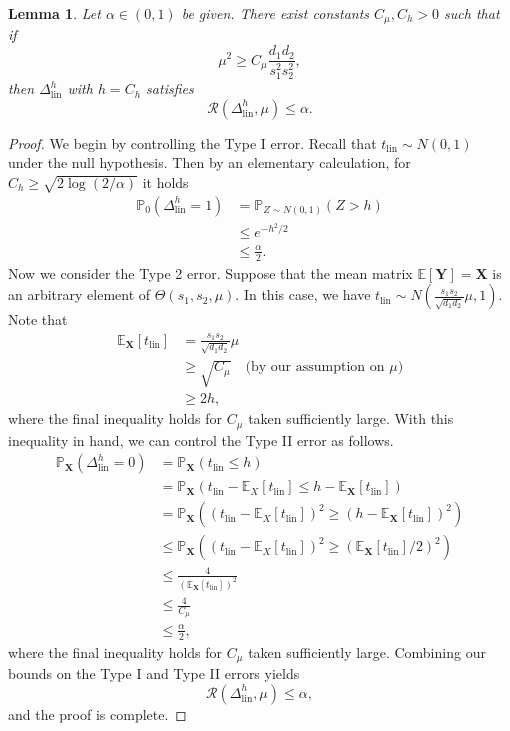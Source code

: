 \documentclass{article}
\newcommand{\X}{\mathbf{X}}
\newcommand{\Y}{\mathbf{Y}}
\newcommand{\cR}{\mathcal{R}}
\newcommand{\EE}{\mathbb{E}}
\newcommand{\pr}{\mathbb{P}}
\newcommand{\lin}{\text{lin}}
\newtheorem{lemma}{Lemma}
\theoremstyle{remark}
\begin{document}
\begin{lemma}\label{lem:linear-test}
    Let $\alpha \in (0,1)$ be given. There exist constants $C_\mu, C_h > 0$ such that if
    \[\mu^2 \geq C_\mu \frac{d_1d_2}{s^2_1s_2^2},\]
    then $\Delta^h_\lin$ with $h = C_h$ satisfies
    \[\cR(\Delta^h_\lin, \mu) \leq \alpha.\]
\end{lemma}
\begin{proof}
    We begin by controlling the Type I error. Recall that $t_\lin \sim N(0,1)$ under the null hypothesis. Then by an elementary calculation, for $C_h \geq \sqrt{2\log(2/\alpha)}$ it holds
    \begin{align*}
        \pr_0(\Delta^h_\lin = 1) &= \pr_{Z \sim N(0,1)}(Z  > h) \\
        &\leq e^{-h^2 / 2} \\
        &\leq \frac{\alpha}{2}.
    \end{align*}
    Now we consider the Type 2 error. Suppose that the mean matrix $ \EE[\Y] = \X$ is an arbitrary element of $\Theta(s_1, s_2, \mu)$. In this case, we have $t_\lin \sim N(\frac{s_1s_2}{\sqrt{d_1d_2}}\mu, 1)$. Note that
    \begin{align*}
        \EE_\X[t_\lin] &= \frac{s_1s_2}{\sqrt{d_1d_2}}\mu \\
        &\geq \sqrt{C_\mu} \quad \text{(by our assumption on $\mu$)} \\
        &\geq 2h,
    \end{align*}
    where the final inequality holds for $C_\mu$ taken sufficiently large. With this inequality in hand, we can control the Type II error as follows.
    \begin{align*}
        \pr_\X(\Delta^h_\lin = 0) &= \pr_\X(t_\lin \leq h) \\
        &= \pr_\X(t_\lin - \EE_X [t_\lin] \leq h - \EE_\X [t_\lin]) \\
        &= \pr_\X((t_\lin - \EE_X [t_\lin])^2 \geq (h - \EE_\X [t_\lin])^2) \\
        &\leq \pr_\X((t_\lin - \EE_X [t_\lin])^2 \geq (\EE_\X [t_\lin] / 2)^2) \\
        &\leq \frac{4}{(\EE_\X[t_\lin])^2} \\
        &\leq \frac{4}{C_\mu} \\
        &\leq \frac{\alpha}{2},
    \end{align*}
    where the final inequality holds for $C_\mu$ taken sufficiently large. Combining our bounds on the Type I and Type II errors yields
    \[\cR(\Delta^h_\lin, \mu) \leq \alpha,\]
    and the proof is complete.
\end{proof}
\end{document}
